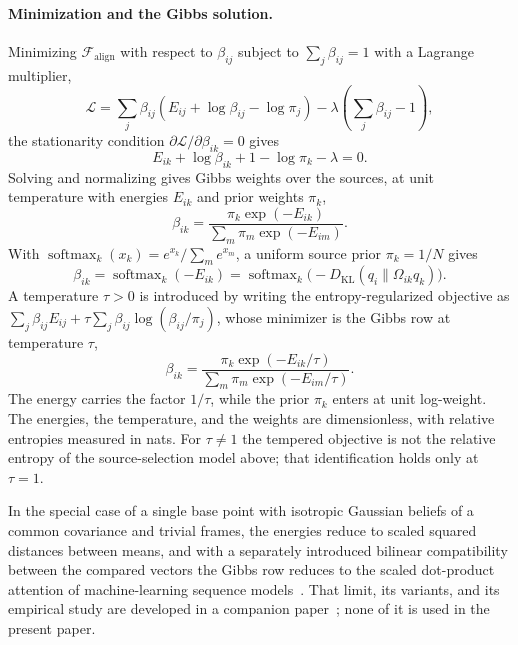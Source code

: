 \documentclass[11pt]{article}
\begin{document}
\paragraph{Minimization and the Gibbs solution.}
Minimizing $\mathcal{F}_{\text{align}}$ with respect to $\beta_{ij}$ subject to $\sum_j \beta_{ij} = 1$ with a Lagrange multiplier,
\begin{equation}
\mathcal{L} = \sum_j \beta_{ij}(E_{ij} + \log \beta_{ij} - \log \pi_j) - \lambda\left(\sum_j \beta_{ij} - 1\right),
\end{equation}
the stationarity condition $\partial \mathcal{L} / \partial \beta_{ik} = 0$ gives
\begin{equation}
E_{ik} + \log \beta_{ik} + 1 - \log \pi_k - \lambda = 0.
\end{equation}
Solving and normalizing gives Gibbs weights over the sources, at unit temperature with energies $E_{ik}$ and prior weights $\pi_k$,
\begin{equation}
\beta_{ik} = \frac{\pi_k \exp(-E_{ik})}{\sum_m \pi_m \exp(-E_{im})}.
\label{eq:softmax_attention_general}
\end{equation}
With $\operatorname{softmax}_k(x_k) = e^{x_k}/\sum_m e^{x_m}$, a uniform source prior $\pi_k = 1/N$ gives
\begin{equation}
\boxed{\beta_{ik} = \operatorname{softmax}_k(-E_{ik}) = \operatorname{softmax}_k\big(-D_{\mathrm{KL}}(q_i \| \Omega_{ik} q_k)\big).}
\label{eq:mixture_softmax}
\end{equation}
A temperature $\tau>0$ is introduced by writing the entropy-regularized objective as $\sum_j\beta_{ij}E_{ij}+\tau\sum_j\beta_{ij}\log(\beta_{ij}/\pi_j)$, whose minimizer is the Gibbs row at temperature $\tau$,
\begin{equation}
\beta_{ik}
= \frac{\pi_k\exp(-E_{ik}/\tau)}{\sum_m \pi_m\exp(-E_{im}/\tau)}.
\end{equation}
The energy carries the factor $1/\tau$, while the prior $\pi_k$ enters at unit log-weight. The energies, the temperature, and the weights are dimensionless, with relative entropies measured in nats. For $\tau \neq 1$ the tempered objective is not the relative entropy of the source-selection model above; that identification holds only at $\tau = 1$.

In the special case of a single base point with isotropic Gaussian beliefs of a common covariance and trivial frames, the energies reduce to scaled squared distances between means, and with a separately introduced bilinear compatibility between the compared vectors the Gibbs row reduces to the scaled dot-product attention of machine-learning sequence models~\cite{vaswani2017attention}. That limit, its variants, and its empirical study are developed in a companion paper~\cite{DennisGLKAttention2026}; none of it is used in the present paper.
\end{document}
